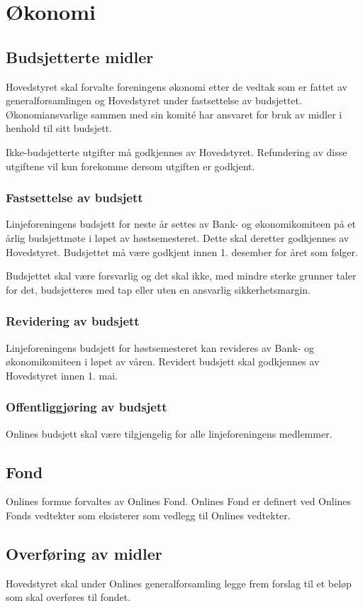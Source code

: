 \chapter{Økonomi}
\label{chap:okonomi}
\vspace{23pt}

\section{Budsjetterte midler}
Hovedstyret skal forvalte foreningens økonomi etter de vedtak som er fattet av generalforsamlingen og Hovedstyret under fastsettelse av budsjettet. Økonomiansvarlige sammen med sin komité har ansvaret for bruk av midler i henhold til sitt budsjett.

Ikke-budsjetterte utgifter må godkjennes av Hovedstyret. Refundering av disse utgiftene vil kun forekomme dersom utgiften er godkjent.

\subsection{Fastsettelse av budsjett}
Linjeforeningens budsjett for neste år settes av Bank- og økonomikomiteen på et årlig budsjettmøte i løpet av høstsemesteret. Dette skal deretter godkjennes av Hovedstyret. Budsjettet må være godkjent innen 1. desember for året som følger.

Budsjettet skal være forsvarlig og det skal ikke, med mindre sterke grunner taler for det, budsjetteres med tap eller uten en ansvarlig sikkerhetsmargin.

\subsection{Revidering av budsjett}
Linjeforeningens budsjett for høstsemesteret kan revideres av Bank- og økonomikomiteen i løpet av våren. Revidert budsjett skal godkjennes av Hovedstyret innen 1. mai.

\subsection{Offentliggjøring av budsjett}
Onlines budsjett skal være tilgjengelig for alle linjeforeningens medlemmer.

\section{Fond}
\vspace{23pt}

Onlines formue forvaltes av Onlines Fond. Onlines Fond er definert ved Onlines Fonds vedtekter som eksisterer som vedlegg til Onlines vedtekter.

\section{Overføring av midler}
\vspace{23pt}

Hovedstyret skal under Onlines generalforsamling legge frem forslag til et beløp som skal overføres til fondet.
